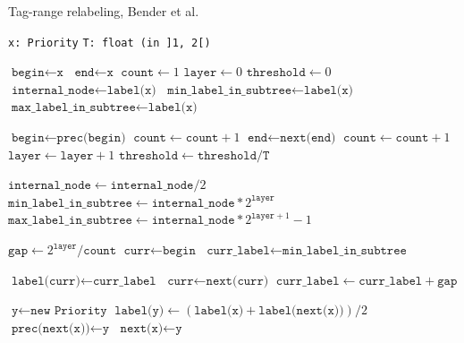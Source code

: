 \documentclass[12pt]{article}
\begin{document}
\begin{algorithm}
  \caption{Tag-range relabeling, Bender et al.} \label{alg:bender}

  \begin{algorithmic}
    \Require \texttt{x: Priority}
    \Require \texttt{T: float (in ]1, 2[)}




    \State $\texttt{begin} \gets \texttt{x}$
    \State $\texttt{end} \gets \texttt{x}$
    \State $\texttt{count} \gets 1$
    \State $\texttt{layer} \gets 0$
    \State $\texttt{threshold} \gets 0$
    \State $\texttt{internal\_node} \gets \texttt{label(x)}$
    \State $\texttt{min\_label\_in\_subtree} \gets \texttt{label(x)}$
    \State $\texttt{max\_label\_in\_subtree} \gets \texttt{label(x)}$


    \State $\texttt{begin} \gets \texttt{prec(begin)}$
    \State $\texttt{count} \gets \texttt{count} + 1$
    \EndWhile
    \State $\texttt{end} \gets \texttt{next(end)}$
    \State $\texttt{count} \gets \texttt{count} + 1$
    \EndWhile
    \State $\texttt{layer} \gets \texttt{layer} + 1$
    \State $\texttt{threshold} \gets \texttt{threshold} / \texttt{T}$

    \State $\texttt{internal\_node} \gets \texttt{internal\_node} / 2$ 
    \State $\texttt{min\_label\_in\_subtree} \gets \texttt{internal\_node} * 2^{\texttt{layer}}$ 
    \State $\texttt{max\_label\_in\_subtree} \gets \texttt{internal\_node} * 2^{\texttt{layer} + 1} - 1$ 
    \EndWhile


    \State $\texttt{gap} \gets 2^{\texttt{layer}} / \texttt{count}$
    \State $\texttt{curr} \gets \texttt{begin}$
    \State $\texttt{curr\_label} \gets \texttt{min\_label\_in\_subtree}$

    \State $\texttt{label(curr)} \gets \texttt{curr\_label}$
    \State $\texttt{curr} \gets \texttt{next(curr)}$
    \State $\texttt{curr\_label} \gets \texttt{curr\_label} + \texttt{gap}$
    \EndWhile

    \EndIf

    \State $\texttt{y} \gets \texttt{new Priority}$
    \State $\texttt{label(y)} \gets (\texttt{label(x)} + \texttt{label(next(x))}) / 2 $
    \State $\texttt{prec(next(x))} \gets \texttt{y}$
    \State $\texttt{next(x)} \gets \texttt{y}$




  \end{algorithmic}
\end{algorithm}
\end{document}
